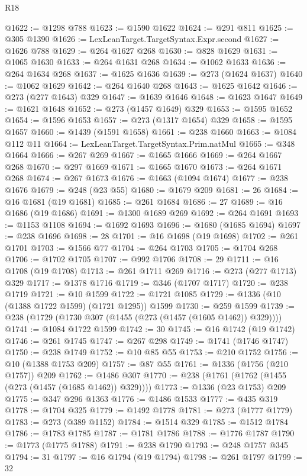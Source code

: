 \begin{lexlean}{R18}
\begin{coremodule}
{{{{{{{{{{{{{{{{{{{{{{{{{{{{{{{{{{{{{{{{{{{{{{{{{{{{{{{{{{{{{{{{{{{{{{{{{{{{{{{{{{{{{{{{{{{{{{{{{{{{{{{{{{{{{{{{{{{{{{{{{{{{{{{{{{{{{{{{{{{{{{{@1622 := @1298 @788
@1623 := @1590 @1622
@1624 := @291 @811
@1625 := @305 @1390
@1626 := LexLeanTarget.TargetSyntax.Expr.second
@1627 := @1626 @788
@1629 := @264 @1627 @268
@1630 := @828 @1629
@1631 := @1065 @1630
@1633 := @264 @1631 @268
@1634 := @1062 @1633
@1636 := @264 @1634 @268
@1637 := @1625 @1636
@1639 := @273 (@1624 @1637)
@1640 := @1062 @1629
@1642 := @264 @1640 @268
@1643 := @1625 @1642
@1646 := @273 (@277 @1643) @329
@1647 := @1639 @1646
@1648 := @1623 @1647
@1649 := @1621 @1648
@1652 := @273 (@1457 @1649) @329
@1653 := @1595 @1652
@1654 := @1596 @1653
@1657 := @273 (@1317 @1654) @329
@1658 := @1595 @1657
@1660 := @1439 (@1591 @1658)
@1661 := @238 @1660
@1663 := @1084 @112 @11
@1664 := LexLeanTarget.TargetSyntax.Prim.natMul
@1665 := @348 @1664
@1666 := @267 @269
@1667 := @1665 @1666
@1669 := @264 @1667 @268
@1670 := @297 @1669
@1671 := @1665 @1670
@1673 := @264 @1671 @268
@1674 := @267 @1673
@1676 := @1663 (@1094 @1674)
@1677 := @238 @1676
@1679 := @248 (@23 @55)
@1680 := @1679 @209
@1681 := 26
@1684 := @16 @1681 (@19 @1681)
@1685 := @261 @1684
@1686 := 27
@1689 := @16 @1686 (@19 @1686)
@1691 := @1300 @1689 @269
@1692 := @264 @1691
@1693 := @1153 @1108
@1694 := @1692 @1693
@1696 := @1680 (@1685 @1694)
@1697 := @238 @1696
@1698 := 28
@1701 := @16 @1698 (@19 @1698)
@1702 := @261 @1701
@1703 := @1566 @77
@1704 := @264 @1703
@1705 := @1704 @268
@1706 := @1702 @1705
@1707 := @992 @1706
@1708 := 29
@1711 := @16 @1708 (@19 @1708)
@1713 := @261 @1711 @269
@1716 := @273 (@277 @1713) @329
@1717 := @1378 @1716
@1719 := @346 (@1707 @1717)
@1720 := @238 @1719
@1721 := @10 @1599
@1722 := @1721 @1085
@1729 := @1336 (@10 (@1388 @1722 @1599) (@1721 @1295)) @1599
@1730 := @259 @1599
@1739 := @238 (@1729 (@1730 @307 (@1455 (@273 (@1457 (@1605 @1462)) @329))))
@1741 := @1084 @1722 @1599
@1742 := 30
@1745 := @16 @1742 (@19 @1742)
@1746 := @261 @1745
@1747 := @267 @298
@1749 := @1741 (@1746 @1747)
@1750 := @238 @1749
@1752 := @10 @85 @55
@1753 := @210 @1752
@1756 := @10 (@1388 @1753 @209)
@1757 := @87 @55
@1761 := @1336 (@1756 (@210 @1757)) @209
@1762 := @1486 @307
@1770 := @238 (@1761 (@1762 (@1455 (@273 (@1457 (@1685 @1462)) @329))))
@1773 := @1336 (@23 @1753) @209
@1775 := @347 @296 @1363
@1776 := @1486 @1533
@1777 := @435 @319
@1778 := @1704 @325
@1779 := @1492 @1778
@1781 := @273 (@1777 @1779)
@1783 := @273 (@389 @1152)
@1784 := @1514 @329
@1785 := @1512 @1784
@1786 := @1783 @1785
@1787 := @1781 @1786
@1788 := @1776 @1787
@1790 := @1773 (@1775 @1788)
@1791 := @238 @1790
@1793 := @248 @1757 @345
@1794 := 31
@1797 := @16 @1794 (@19 @1794)
@1798 := @261 @1797
@1799 := 32
}}}}}}}}}}}}}}}}}}}}}}}}}}}}}}}}}}}}}}}}}}}}}}}}}}}}}}}}}}}}}}}}}}}}}}}}}}}}}}}}}}}}}}}}}}}}}}}}}}}}}}}}}}}}}}}}}}}}}}}}}}}}}}}}}}}}}}}}}}}}}}}
\end{coremodule}
\end{lexlean}
